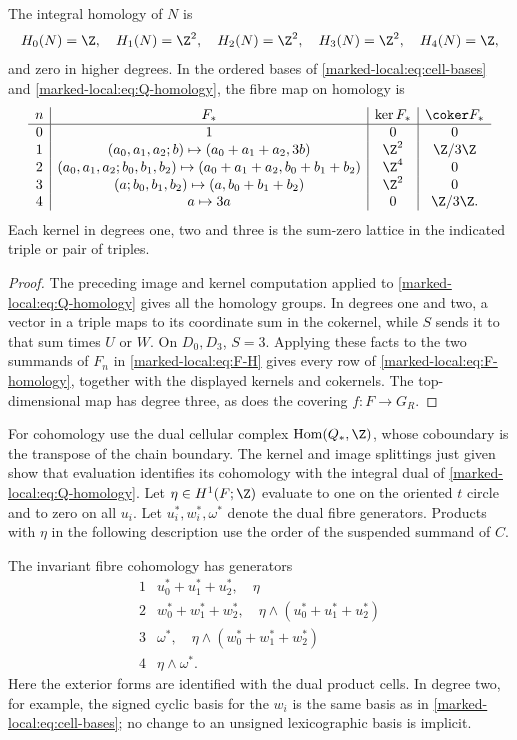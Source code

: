 \begin{theorem}\label{marked-local:thm:homology}
The integral homology of $N$ is
\[
 H_0(N)=\Z,\quad H_1(N)=\Z^2,\quad H_2(N)=\Z^2,
 \quad H_3(N)=\Z^2,\quad H_4(N)=\Z,
\]
and zero in higher degrees. In the ordered bases of
\eqref{marked-local:eq:cell-bases} and \eqref{marked-local:eq:Q-homology}, the fibre map on
homology is
\begin{equation}\label{marked-local:eq:F-homology}
\begin{array}{c|c|c|c}
 n&F_*&\ker F_*&\coker F_*\\ \hline
 0&1&0&0\\
 1&(a_0,a_1,a_2;b)\mapsto(a_0+a_1+a_2,3b)&\Z^2&\Z/3\Z\\
 2&(a_0,a_1,a_2;b_0,b_1,b_2)\mapsto
       (a_0+a_1+a_2,b_0+b_1+b_2)&\Z^4&0\\
 3&(a;b_0,b_1,b_2)\mapsto(a,b_0+b_1+b_2)&\Z^2&0\\
 4&a\mapsto3a&0&\Z/3\Z.
\end{array}
\end{equation}
Each kernel in degrees one, two and three is the sum-zero lattice
in the indicated triple or pair of triples.
\end{theorem}
\begin{proof}
The preceding image and kernel computation applied to
\eqref{marked-local:eq:Q-homology} gives all the homology groups.
In degrees one and two, a vector in a triple maps to its coordinate
sum in the cokernel, while $S$ sends it to that sum times $U$ or $W$.
On $D_0,D_3$, $S=3$. Applying these facts to the two summands
of $F_n$ in \eqref{marked-local:eq:F-H} gives every row of
\eqref{marked-local:eq:F-homology}, together with the displayed kernels and
cokernels. The top-dimensional map has degree three, as does the
covering $f:F\to G_R$.
\end{proof}

For cohomology use the dual cellular complex
$\operatorname{Hom}(Q_*,\Z)$, whose coboundary is the transpose of
the chain boundary. The kernel and image splittings just given show
that evaluation identifies its cohomology with the integral dual of
\eqref{marked-local:eq:Q-homology}. Let $\eta\in H^1(F;\Z)$ evaluate to one
on the oriented $t$ circle and to zero on all $u_i$.
Let $u_i^*,w_i^*,\omega^*$ denote
the dual fibre generators. Products with $\eta$ in the following
description use the order of the suspended summand of $C$.

The invariant fibre cohomology has generators
\[
\begin{array}{c|c}
 1&u_0^*+u_1^*+u_2^*,\quad\eta\\
 2&w_0^*+w_1^*+w_2^*,\quad
       \eta\wedge(u_0^*+u_1^*+u_2^*)\\
 3&\omega^*,\quad\eta\wedge(w_0^*+w_1^*+w_2^*)\\
 4&\eta\wedge\omega^*.
\end{array}
\]
Here the exterior forms are identified with the dual product cells.
In degree two, for example, the signed cyclic basis for the $w_i$
is the same basis as in \eqref{marked-local:eq:cell-bases}; no change to an
unsigned lexicographic basis is implicit.

